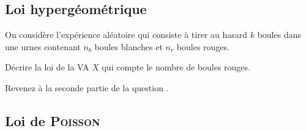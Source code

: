\documentclass[11pt, a4paper]{article}
\begin{document}
\subsection{Loi hypergéométrique}
\label{sec:loihypergeometrique}

On considère l'expérience aléatoire qui consiste à tirer au hasard $k$
boules dans une urnes contenant $n_b$ boules blanches et $n_r$ boules
rouges.
\begin{question}
  Décrire la loi de la VA $X$ qui compte le nombre de boules rouges.
\end{question}
\begin{question}
  Revenez à la seconde partie de la question .
\end{question}

\subsection{Loi de \textsc{Poisson}}
\label{sec:loidepoisson}
\end{document}
